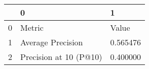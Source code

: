 \begin{tabular}{lll}
\toprule
 & 0 & 1 \\
\midrule
0 & Metric & Value \\
1 & Average Precision & 0.565476 \\
2 & Precision at 10 (P@10) & 0.400000 \\
\bottomrule
\end{tabular}
